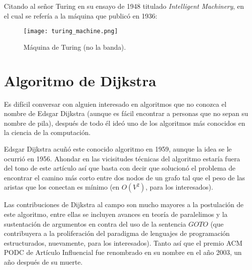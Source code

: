 \documentclass[a4paper,10pt]{article}
\begin{document}
Citando al señor Turing en su ensayo de 1948 titulado \textit{Intelligent Machinery}, en el cual se refería a la máquina que publicó en 1936:



\begin{figure}[h]
  \begin{center}
    \texttt{[image: turing\_machine.png]}
  \end{center}
  \caption{
    Máquina de Turing (no la banda).}
\end{figure}

\section{Algoritmo de Dijkstra}

Es difícil conversar con alguien interesado en algoritmos que no conozca el nombre de Edsgar Dijkstra (aunque es fácil encontrar a personas que no sepan su nombre de pila), después de todo él ideó uno de los algoritmos más conocidos en la ciencia de la computación.

Edsgar Dijkstra acuñó este conocido algoritmo en 1959, aunque la idea se le ocurrió en 1956. Ahondar en las vicisitudes técnicas del algoritmo estaría fuera del tono de este artículo así que basta con decir que solucionó el problema de encontrar el camino más corto entre dos nodos de un grafo tal que el peso de las aristas que los conectan es mínimo (en $O(V^2)$, para los interesados). 

Las contribuciones de Dijkstra al campo son mucho mayores a la postulación de este algoritmo, entre ellas se incluyen avances en teoría de paralelimos y la sustentación de argumentos en contra del uso de la sentencia $GOTO$ (que contribuyera a la proliferación del paradigma de lenguajes de programación estructurados, nuevamente, para los interesados). Tanto así que el premio ACM PODC de Artículo Influencial fue renombrado en su nombre en el año 2003, un año después de su muerte.
\end{document}
